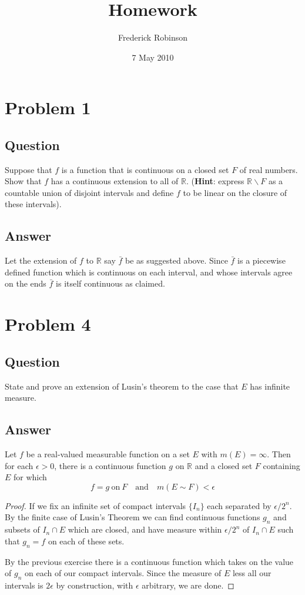 \documentclass[12pt]{article}
\title{Homework}
\author{Frederick Robinson}
\date{7 May 2010}
\begin{document}

   \maketitle

\setcounter{tocdepth}{2} 

\section{Problem 1}
\subsection{Question}
Suppose that $f$ is a function that is continuous on a closed set $F$ of real numbers. Show that $f$ has a continuous extension to all of $\mathbb{R}$. ({\bf Hint}: express $\mathbb{R} \backslash F$ as a countable union of disjoint intervals and define $f$ to be linear on the closure of these intervals). 
\subsection{Answer}
Let the extension of $f$ to $\mathbb{R}$ say $\bar{f}$ be as suggested above. Since $\bar{f}$ is a piecewise defined function which is continuous on each interval, and whose intervals agree on the ends $\bar{f}$ is itself continuous as claimed.

\section{Problem 4}
\subsection{Question}
State and prove an extension of Lusin's theorem to the case that $E$ has infinite measure. 
\subsection{Answer}
Let $f$ be a real-valued measurable function on a set $E$ with $m(E)=\infty$. Then for each $\epsilon > 0$, there is a continuous function $g$ on $\mathbb{R}$ and a closed set $F$ containing $E$ for which 
\[f=g \mathrm{\ on\ } F \quad \mathrm{and} \quad m(E \sim F) < \epsilon\]
\begin{proof}
If we fix an infinite set of compact intervals $\{I_n\}$ each separated by $\epsilon / 2^n$. By the finite case of Lusin's Theorem we can find continuous functions $g_n$  and subsets of  $I_n \cap E$ which are closed, and have measure within $\epsilon / 2^n$ of $I_n \cap E$ such that $g_n=f$ on each of these sets.

By the previous exercise there is a continuous function which takes on the value of $g_n$ on each of our compact intervals. Since the measure of $E$ less all our intervals is $2 \epsilon$ by construction, with $\epsilon$ arbitrary, we are done.
\end{proof}
\end{document}
